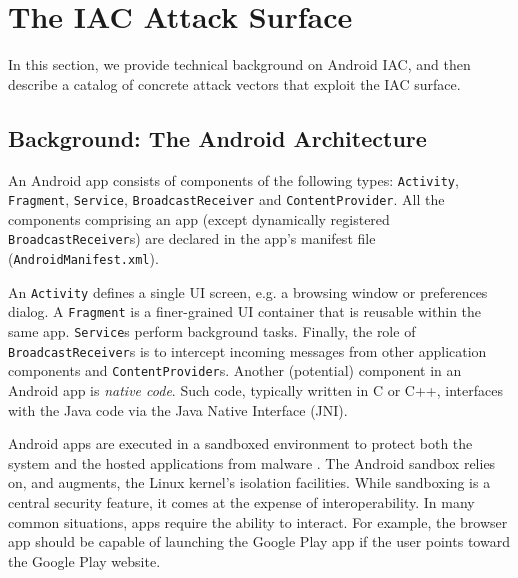 \section{The IAC Attack Surface}\label{Se:surface}

In this section, we provide technical background on Android IAC, and then describe a catalog of concrete attack vectors that exploit the IAC surface.

\subsection{Background: The Android Architecture}\label{Se:andarchitecture}

An Android app consists of components of the following types:
{\tt Activity}, {\tt Fragment}, {\tt Service},
{\tt BroadcastReceiver} and {\tt ContentProvider}. 
%
All the components comprising an app (except dynamically registered {\tt BroadcastReceiver}s)
are declared in the app's manifest
file (\texttt{AndroidManifest.xml}).

An {\tt Activity}
defines a single UI screen, e.g. a browsing window or preferences dialog. A {\tt Fragment} is
a finer-grained UI container that is reusable within the same app. {\tt Service}s perform background tasks. Finally, the role of {\tt BroadcastReceiver}s is to intercept incoming messages from other application components and {\tt ContentProvider}s.
%
Another (potential) component in an Android app is \textit{native code}. Such code,
typically written in C or C++, interfaces with the Java code via the Java Native Interface (JNI).

Android apps are executed in a sandboxed environment
to protect both the system and the hosted applications from
malware \cite{EOM:SP09}. 
%
%
The Android sandbox relies on, and augments, the Linux kernel's isolation
facilities.
%
%
While sandboxing is a central security feature, it comes at the expense of interoperability. In many common situations, apps require the ability to interact. For example, the browser app should be capable of launching the Google Play app if the user points toward the Google Play website. 

